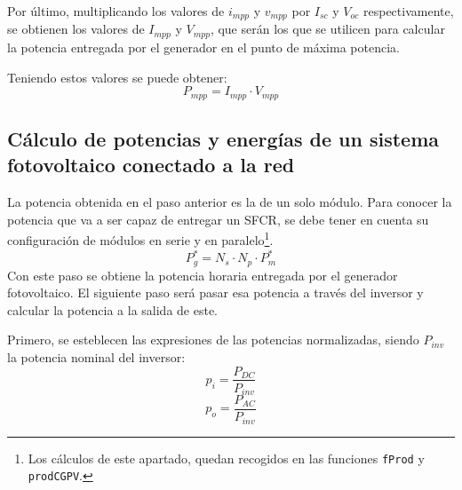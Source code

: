 Por último, multiplicando los valores de \(i_{mpp}\) y \(v_{mpp}\) por \(I_{sc}\) y \(V_{oc}\) respectivamente, se obtienen los valores de \(I_{mpp}\) y \(V_{mpp}\), que serán los que se utilicen para calcular la potencia entregada por el generador en el punto de máxima potencia.

Teniendo estos valores se puede obtener:
\begin{equation}
P_{mpp}=I_{mpp}\cdot V_{mpp}
\end{equation}

\subsection{Cálculo de potencias y energías de un sistema fotovoltaico conectado a la red}
\label{sec:orgaafe2a8}
\label{subsec:calculo-potencias-energias}
La potencia obtenida en el paso anterior es la de un solo módulo. Para conocer la potencia que va a ser capaz de entregar un SFCR, se debe tener en cuenta su configuración de módulos en serie y en paralelo\footnote{Los cálculos de este apartado, quedan recogidos en las funciones \texttt{fProd} y \texttt{prodCGPV}.}.
\begin{equation}
P_g^*=N_s\cdot N_p\cdot P_m^*
\end{equation}
Con este paso se obtiene la potencia horaria entregada por el generador fotovoltaico. El siguiente paso será pasar esa potencia a través del inversor y calcular la potencia a la salida de este.

Primero, se esteblecen las expresiones de las potencias normalizadas, siendo \(P_{inv}\) la potencia nominal del inversor:
\begin{equation}
p_i=\frac{P_{DC}}{P_{inv}}
\end{equation}
\begin{equation}
p_o=\frac{P_{AC}}{P_{inv}}
\end{equation}

